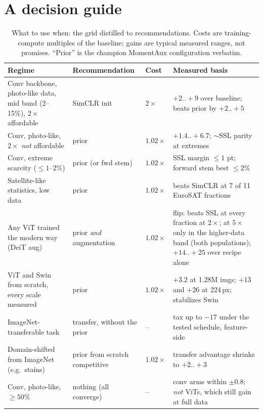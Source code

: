 \section{A decision guide}\label{sec:guide}

\begin{table}[pos=htbp]
\caption{What to use when: the grid distilled to recommendations. Costs
are training-compute multiples of the baseline; gains are typical measured
ranges, not promises. ``Prior'' is the champion MomentAux configuration
verbatim.}
\label{tab:guide}
\centering\scriptsize
\setlength{\tabcolsep}{2.6pt}
\begin{tabular}{P{0.285\columnwidth}P{0.205\columnwidth}lP{0.265\columnwidth}}
\toprule
Regime & Recommendation & Cost & Measured basis \\
\midrule
Conv backbone, photo-like data, mid band (2--15\%), $2\times$ affordable & SimCLR init & $2\times$ & $+2..{+}9$ over baseline; beats prior by $+2..{+}5$ \\
Conv, photo-like, $2\times$ \emph{not} affordable & prior & $1.02\times$ & $+1.4..{+}6.7$; ${\sim}$SSL parity at extremes \\
Conv, extreme scarcity (${\leq}1$--$2\%$) & prior (or fwd stem) & $1.02\times$ & SSL margin ${\leq}1$ pt; forward stem best ${\leq}2\%$ \\
Satellite-like statistics, low data & prior & $1.02\times$ & beats SimCLR at 7 of 11 EuroSAT fractions \\
Any ViT trained the modern way (DeiT aug) & prior \emph{and} augmentation & $1.02\times$ & flip: beats SSL at every fraction at $2\times$; at $5\times$ only in the higher-data band (both populations); $+14..{+}25$ over recipe alone \\
ViT and Swin from scratch, every scale measured & prior & $1.02\times$ & $+3.2$ at 1.28M imgs; $+13$ and $+26$ at 224\,px; stabilizes Swin \\
ImageNet-transferable task & transfer, without the prior &--& tax up to $-17$ under the tested schedule, feature-side \\
Domain-shifted from ImageNet (e.g.\ stains) & prior from scratch competitive & $1.02\times$ & transfer advantage shrinks to $+2..{+}3$ \\
Conv, photo-like, ${\geq}50\%$ & nothing (all converge) &--& conv arms within $\pm 0.8$; \emph{not} ViTs, which still gain at full data \\
\bottomrule
\end{tabular}
\end{table}

